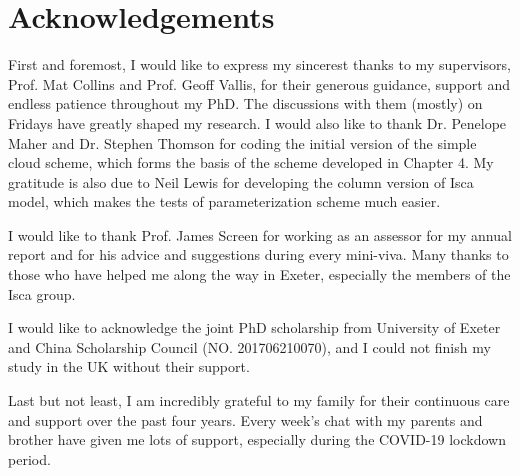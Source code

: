 \makedeclaration

\newpage
\chapter*{Acknowledgements}
First and foremost, I would like to express my sincerest thanks to my supervisors, Prof. Mat Collins and Prof. Geoff Vallis, for their generous guidance, support and endless patience throughout my PhD. The discussions with them (mostly) on Fridays have greatly shaped my research. I would also like to thank Dr. Penelope Maher and Dr. Stephen Thomson for coding the initial version of the simple cloud scheme, which forms the basis of the scheme developed in Chapter 4. My gratitude is also due to Neil Lewis for developing the column version of Isca model, which makes the tests of parameterization scheme much easier.

I would like to thank Prof. James Screen for working as an assessor for my annual report and for his advice and suggestions during every mini-viva. Many thanks to those who have helped me along the way in Exeter, especially the members of the Isca group. 


I would like to acknowledge the joint PhD scholarship from University of Exeter and China Scholarship Council (NO. 201706210070), and I could not finish my study in the UK without their support.

Last but not least, I am incredibly grateful to my family for their continuous care and support over the past four years. Every week's chat with my parents and brother have given me lots of support, especially during the COVID-19 lockdown period.


